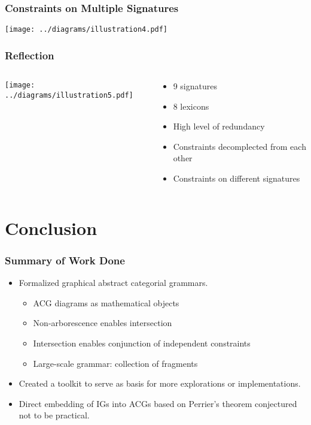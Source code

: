 \documentclass{beamer}
\begin{document}
\begin{frame}
  \addtocounter{framenumber}{-1}
  \frametitle{Constraints on Multiple Signatures}
  \begin{center}
    \texttt{[image: ../diagrams/illustration4.pdf]}
  \end{center}
\end{frame}


\begin{frame}
  \frametitle{Reflection}
  \begin{columns}[c]
    \begin{column}{0.5\textwidth}
      \begin{center}
        \texttt{[image: ../diagrams/illustration5.pdf]}
      \end{center}
    \end{column}
    \begin{column}{0.5\textwidth}
      \begin{itemize}
        \item 9 signatures
        \item 8 lexicons
        \item High level of redundancy
        \item Constraints decomplected from each other
        \item Constraints on different signatures
      \end{itemize}
    \end{column}
  \end{columns}
\end{frame}



\section{Conclusion}

\begin{frame}
  \frametitle{Summary of Work Done}

  \begin{itemize}
  \item Formalized graphical abstract categorial grammars.
    \begin{itemize}
      \item ACG diagrams as mathematical objects
      \item Non-arborescence enables intersection
      \item Intersection enables conjunction of independent constraints
      \item Large-scale grammar: collection of fragments
    \end{itemize}
  \vfill
  \item Created a toolkit to serve as basis for more explorations or
    implementations.
  \vfill
  \item Direct embedding of IGs into ACGs based on Perrier's theorem
    conjectured not to be practical.
  \end{itemize}
\end{frame}
\end{document}
